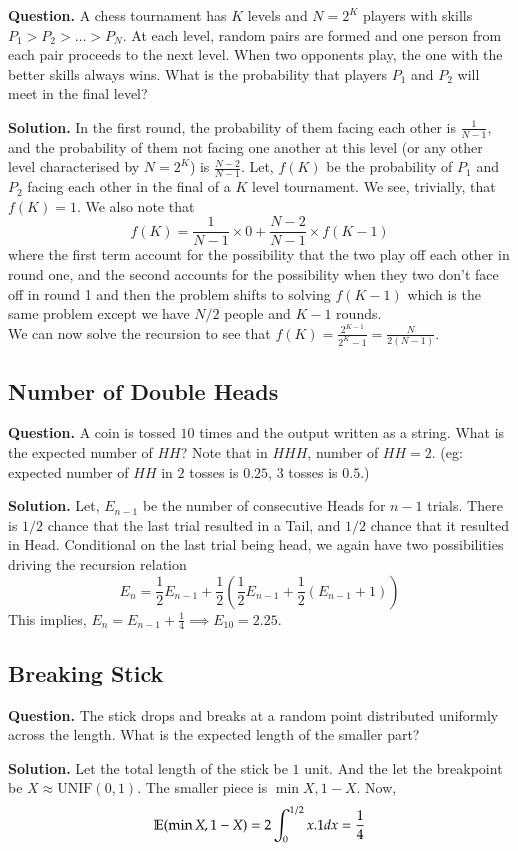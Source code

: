 \textbf{Question.} A chess tournament has $K$ levels and $N=2^K$ players with skills $P_1>P_2> \dots >P_N$. At each level, random pairs are formed and one person from each pair proceeds to the next level. When two opponents play, the one with the better skills always wins. What is the probability that players $P_1$ and $P_2$ will meet in the final level?

\textbf{Solution.}
In the first round, the probability of them facing each other is $\frac{1}{N-1}$, and the probability of them not facing one another at this level (or any other level characterised by $N = 2^K$) is $\frac{N-2}{N-1}$. Let, $f(K)$ be the probability of $P_1$ and $P_2$ facing each other in the final of a $K$ level tournament. We see, trivially, that $f(K) = 1$. We also note that \[f(K) = \frac{1}{N-1} \times 0 + \frac{N-2}{N-1} \times f(K-1)\]
where the first term account for the possibility that the two play off each other in round one, and the second accounts for the possibility when they two don't face off in round 1 and then the problem shifts to solving $f(K-1)$ which is the same problem except we have $N/2$ people and $K-1$ rounds. \\
We can now solve the recursion to see that $f(K) = \frac{2^{K-1}}{2^K - 1} = \frac{N}{2(N-1)}$.

\subsection{Number of Double Heads}

\textbf{Question.} A coin is tossed $10$ times and the output written as a string. What is the expected number of $HH$? Note that in $HHH$, number of $HH = 2$. (eg: expected number of $HH$ in $2$ tosses is $0.25$, $3$ tosses is $0.5$.)

\textbf{Solution.}
Let, $E_{n-1}$ be the number of consecutive Heads for $n-1$ trials. There is $1/2$ chance that the last trial resulted in a Tail, and $1/2$ chance that it resulted in Head. Conditional on the last trial being head, we again have two possibilities driving the recursion relation 
\[E_n = \frac{1}{2} E_{n-1} + \frac{1}{2} \left(\frac{1}{2} E_{n-1} + \frac{1}{2} (E_{n-1} + 1)\right)\]
This implies, $E_n = E_{n-1} + \frac{1}{4} \implies E_{10} = 2.25$.

\subsection{Breaking Stick}

\textbf{Question.} The stick drops and breaks at a random point distributed uniformly across the length. What is the expected length of the smaller part?

\textbf{Solution.} Let the total length of the stick be $1$ unit. And the let the breakpoint be $X \approx \text{UNIF}(0,1)$. The smaller piece is $\min{X,1-X}$. Now,
\[\mathbb{E}(\min{X,1-X}) = 2 \int_{0}^{1/2} x . 1 \space dx = \frac{1}{4}\]
